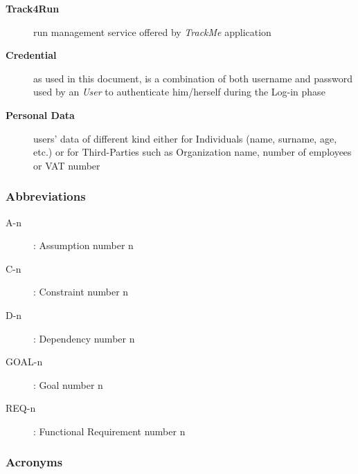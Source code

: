 \documentclass[a4paper]{article}
\begin{document}
\begin{description}
                    \item[\textbf{Track4Run}] run management service offered by \textit{TrackMe} application
                    
                    \item[\textbf{Credential}] as used in this document, is a combination of both username and password used by an \textit{User} to authenticate him/herself during the Log-in phase
                    
                    \item[\textbf{Personal Data}] users' data of different kind either for Individuals (name, surname, age, etc.) or for Third-Parties such as Organization name, number of employees or VAT number
                \end{description}
                
            \subsubsection{Abbreviations}
            \begin{description}
                \item[A-n]: Assumption number n
                \item[C-n]: Constraint number n
                \item[D-n]: Dependency number n
                \item[GOAL-n]: Goal number n
                 \item [REQ-n]: Functional Requirement number n
            \end{description}
            
            \subsubsection{Acronyms}
            \begin{acronym}
                
            \end{acronym}
            
\end{document}
